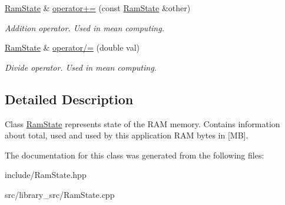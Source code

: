 \begin{DoxyCompactItemize}
\item 
\hyperlink{classRamState}{Ram\+State} \& \hyperlink{classRamState_a0e5831d3cf8bc8c87d325b04459ddfcf}{operator+=} (const \hyperlink{classRamState}{Ram\+State} \&other)\hypertarget{classRamState_a0e5831d3cf8bc8c87d325b04459ddfcf}{}\label{classRamState_a0e5831d3cf8bc8c87d325b04459ddfcf}

\begin{DoxyCompactList}\small\item\em Addition operator. Used in mean computing. \end{DoxyCompactList}\item 
\hyperlink{classRamState}{Ram\+State} \& \hyperlink{classRamState_a89fc47688808511c00150963fcb70494}{operator/=} (double val)\hypertarget{classRamState_a89fc47688808511c00150963fcb70494}{}\label{classRamState_a89fc47688808511c00150963fcb70494}

\begin{DoxyCompactList}\small\item\em Divide operator. Used in mean computing. \end{DoxyCompactList}\end{DoxyCompactItemize}


\subsection{Detailed Description}
Class \hyperlink{classRamState}{Ram\+State} represents state of the R\+AM memory. Contains information about total, used and used by this application R\+AM bytes in \mbox{[}MB\mbox{]}. 

The documentation for this class was generated from the following files\+:\begin{DoxyCompactItemize}
\item 
include/Ram\+State.\+hpp\item 
src/library\+\_\+src/Ram\+State.\+cpp\end{DoxyCompactItemize}
